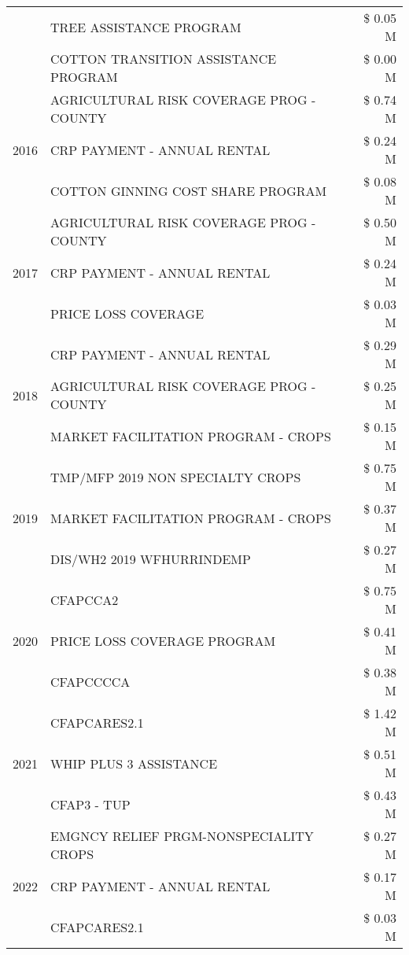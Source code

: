 \begin{tabular}{llr}
 & TREE ASSISTANCE PROGRAM & \$ 0.05 M \\
 & COTTON TRANSITION ASSISTANCE PROGRAM & \$ 0.00 M \\
\cline{1-3}
\multirow[t]{3}{*}{2016} & AGRICULTURAL RISK COVERAGE PROG - COUNTY & \$ 0.74 M \\
 & CRP PAYMENT - ANNUAL RENTAL & \$ 0.24 M \\
 & COTTON GINNING COST SHARE PROGRAM & \$ 0.08 M \\
\cline{1-3}
\multirow[t]{3}{*}{2017} & AGRICULTURAL RISK COVERAGE PROG - COUNTY & \$ 0.50 M \\
 & CRP PAYMENT - ANNUAL RENTAL & \$ 0.24 M \\
 & PRICE LOSS COVERAGE & \$ 0.03 M \\
\cline{1-3}
\multirow[t]{3}{*}{2018} & CRP PAYMENT - ANNUAL RENTAL & \$ 0.29 M \\
 & AGRICULTURAL RISK COVERAGE PROG - COUNTY & \$ 0.25 M \\
 & MARKET FACILITATION PROGRAM - CROPS & \$ 0.15 M \\
\cline{1-3}
\multirow[t]{3}{*}{2019} & TMP/MFP 2019 NON SPECIALTY CROPS & \$ 0.75 M \\
 & MARKET FACILITATION PROGRAM - CROPS & \$ 0.37 M \\
 & DIS/WH2 2019 WFHURRINDEMP & \$ 0.27 M \\
\cline{1-3}
\multirow[t]{3}{*}{2020} & CFAPCCA2 & \$ 0.75 M \\
 & PRICE LOSS COVERAGE PROGRAM & \$ 0.41 M \\
 & CFAPCCCCA & \$ 0.38 M \\
\cline{1-3}
\multirow[t]{3}{*}{2021} & CFAPCARES2.1 & \$ 1.42 M \\
 & WHIP PLUS 3 ASSISTANCE & \$ 0.51 M \\
 & CFAP3 - TUP & \$ 0.43 M \\
\cline{1-3}
\multirow[t]{3}{*}{2022} & EMGNCY RELIEF PRGM-NONSPECIALITY CROPS & \$ 0.27 M \\
 & CRP PAYMENT - ANNUAL RENTAL & \$ 0.17 M \\
 & CFAPCARES2.1 & \$ 0.03 M \\
\cline{1-3}
\bottomrule
\end{tabular}
